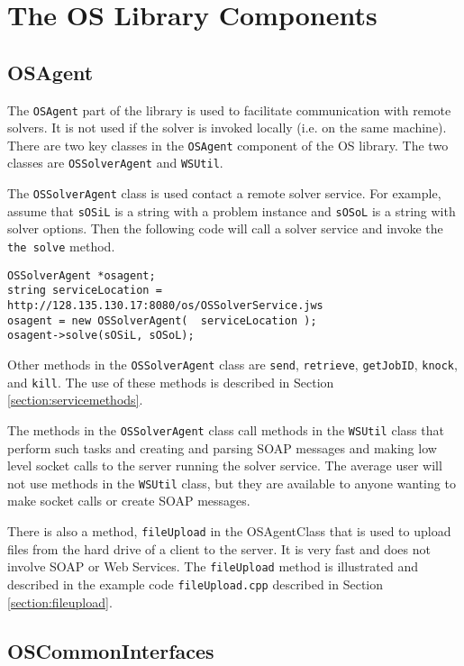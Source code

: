 \documentclass[11pt]{article}
\renewcommand{\_}{{\char"5F}}
\renewcommand{\{}{{\char"7B}}
\renewcommand{\}}{{\char"7D}}
\renewcommand{\^}{{\char"0D}}
\renewcommand{\'}{{\char"0D}}
\begin{document}
\section{The OS Library Components}\label{section:oslibrary}

\subsection{OSAgent}\label{section:osagent}

The {\tt OSAgent}  part of the library is used to facilitate communication with remote solvers. It is not used if the solver is invoked locally (i.e. on the same machine).   There are two key classes in the {\tt OSAgent} component of the OS library. The two classes are {\tt OSSolverAgent} and {\tt WSUtil}.

The {\tt OSSolverAgent} class is used  contact a remote solver service.  For example, assume that {\tt sOSiL} is a string with a problem instance and {\tt sOSoL} is a string with solver options. Then the following code will call a solver service and invoke the {\tt the solve} method.
\begin{verbatim}
OSSolverAgent *osagent;
string serviceLocation = http://128.135.130.17:8080/os/OSSolverService.jws
osagent = new OSSolverAgent(  serviceLocation );
osagent->solve(sOSiL, sOSoL);
\end{verbatim}
Other methods in the {\tt OSSolverAgent} class are {\tt send}, {\tt retrieve}, {\tt getJobID}, {\tt knock}, and {\tt kill}.  The use of these methods is described in Section \ref{section:servicemethods}.



The methods in the {\tt OSSolverAgent} class call methods in the {\tt WSUtil} class that perform such tasks and creating and parsing SOAP messages and making low level socket calls to the server running the solver service. The average user will not use methods in the {\tt WSUtil} class, but they are available to anyone wanting to make socket calls or create SOAP messages. 

There is also a method, {\tt fileUpload} in the OSAgentClass that is used to upload files from the hard drive of a client to the server. It is very fast and does not involve SOAP or Web Services. The {\tt fileUpload}  method is illustrated and described in the example code {\tt fileUpload.cpp} described in Section \ref{section:fileupload}.

\subsection{OSCommonInterfaces}
\end{document}
